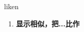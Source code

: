 
\begin{frame}
{\huge liken}
\begin{center}
\begin{enumerate}\Large
  \item \textbf{显示相似，把...比作}
\end{enumerate}
\end{center}
\end{frame}

